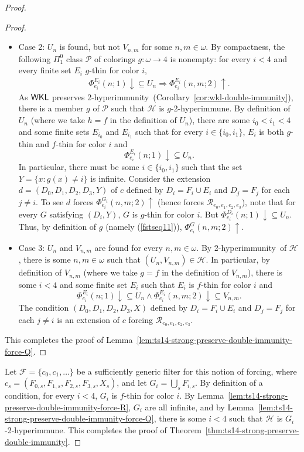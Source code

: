 \documentclass{amsart}
\theoremstyle{definition}
\theoremstyle{remark}
\numberwithin{equation}{section}
\theoremstyle{noparens}
\def\propertyL{2-hyperimmunity}
\def\hyper{2-hyperimmune}
\newcommand{\Fcal}{\mathcal{F}}
\newcommand{\Hcal}{\mathcal{H}}
\newcommand{\Pcal}{\mathcal{P}}
\newcommand{\Rcal}{\mathcal{R}}
\newcommand{\s}[1]{\ensuremath{\sf{#1}}}
\DeclareMathOperator{\wkl}{\s{WKL}}
\begin{document}
\begin{proof}
\begin{proof}
\begin{itemize}
	\item Case 2: $U_n$ is found, but not $V_{n,m}$ for some $n, m \in \omega$. By compactness,
	the  following $\Pi^{0}_1$ class
$\Pcal$ of    colorings $g:\omega\rightarrow 4$  is nonempty:
	for every $i < 4$ and every finite set $E_i $ $g$-thin for color $i$,
\begin{align}\label{fstseq11}
	 \Phi_{e_i}^{E_i}(n;1) \downarrow \subseteq U_n
		\Rightarrow \Phi_{e_i}^{ E_i}(n, m;2) \uparrow.
	\end{align}
 As $\wkl$ preserves \propertyL\
	(Corollary~\ref{cor:wkl-double-immunity}), there is a member $g $
	of $\Pcal$ such that $\Hcal$ is $g$-\hyper.
	By definition of $U_n$ (where we take $h=f$ in the definition of
$U_n$),
	there are some $i_0 < i_1 < 4$ and some finite sets $E_{i_0}$ and $E_{i_1}$
	such that for every  $i \in \{i_0, i_1\}$, $E_i $ is both $g$-thin and $f$-thin for color $i$
and
	$$
	\Phi_{e_i}^{  E_i}(n;1) \downarrow \subseteq U_n.
	$$
	In particular, there must be some $i \in \{i_0, i_1\}$ such that  the set $Y= \{x :g(x)\ne i\}$ is infinite.
	Consider the extension  $d = (D_0, D_1, D_2,D_3, Y)$  of $c$ defined by
	$D_i = F_i \cup E_i$ and $D_j = F_j$ for each $j \neq i$.
To see $d$
	forces
	$\Phi_{e_i}^{  G_i}(n, m;2) \uparrow$ (hence forces $\Rcal_{e_0, e_1, e_2, e_3}$),
note that for every $G$ satisfying $(D_i,Y)$,
$G$ is $g$-thin for color $i$.
But $\Phi_{e_i}^{D_i}(n;1)\downarrow\subseteq U_n$.
Thus, by definition of $g$ (namely (\ref{fstseq11})), $\Phi_{e_i}^{  G}(n, m;2) \uparrow$.
	\bigskip

	\item Case 3: $U_n$ and $V_{n,m}$ are found for every $n,m \in \omega$.
	By  \propertyL\ of $\Hcal$, there is some $n, m \in \omega$
	such that $(U_n, V_{n,m}) \in \Hcal$.
	In particular, by definition of $V_{n,m}$ (where we take $g=f$ in the definition of
$V_{n,m}$), there is some $i < 4$ and some finite set $E_i  $ such that
$E_i$ is $f$-thin for color $i$ and
	$$
	 \Phi_{e_i}^{ E_i }(n;1) \downarrow \subseteq U_n
		\wedge \Phi_{e_i}^{  E_i }(n, m;2) \downarrow\subseteq V_{n,m}.
	$$
	The condition $(D_0, D_1, D_2, D_3, X)$ defined by $D_i = F_i \cup E_i$
	and $D_j = F_j$ for each $j \neq i$ is an extension of $c$ forcing $\Rcal_{e_0, e_1, e_2, e_3}$.
\end{itemize}
This completes the proof of Lemma~\ref{lem:ts14-strong-preserve-double-immunity-force-Q}.
\end{proof}

Let $\Fcal = \{c_0, c_1, \dots \}$ be a sufficiently generic filter for this notion of forcing,
where $c_s = (F_{0,s}, F_{1,s}, F_{2,s}, F_{3,s},\allowbreak X_s)$, and let $G_i = \bigcup_s F_{i,s}$.
By definition of a condition, for every $i < 4$, $G_i $ is $f$-thin for color $i$.
By Lemma~\ref{lem:ts14-strong-preserve-double-immunity-force-R}, $G_i$ are all infinite,
and by Lemma~\ref{lem:ts14-strong-preserve-double-immunity-force-Q}, there is some $i < 4$ such that $\Hcal$ is $  G_i$-\hyper.
This completes the proof of Theorem~\ref{thm:ts14-strong-preserve-double-immunity}.
\end{proof}
\end{document}
